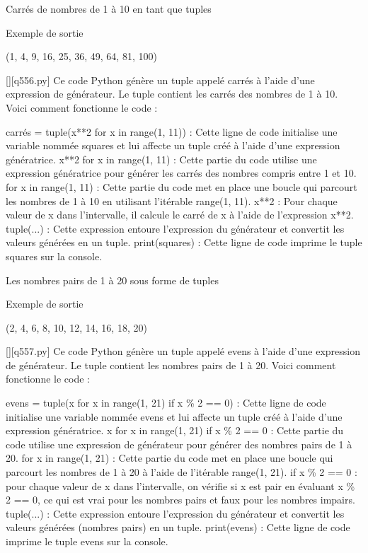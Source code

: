 \renewcommand{\chemincode}{../../code/}
    \question
Carrés de nombres de 1 à 10 en tant que tuples

Exemple de sortie

(1, 4, 9, 16, 25, 36, 49, 64, 81, 100)
        \par
        \begin{solution}
            \renewcommand{\nomfichier}{q556.py}
            \pythonfile{\chemincode \nomfichier}[][\nomfichier]
            Ce code Python génère un tuple appelé carrés à l'aide d'une expression de générateur. Le tuple contient les carrés des nombres de 1 à 10. Voici comment fonctionne le code :

    carrés = tuple(x**2 for x in range(1, 11)) : Cette ligne de code initialise une variable nommée squares et lui affecte un tuple créé à l'aide d'une expression génératrice.
        x**2 for x in range(1, 11) : Cette partie du code utilise une expression génératrice pour générer les carrés des nombres compris entre 1 et 10.
            for x in range(1, 11) : Cette partie du code met en place une boucle qui parcourt les nombres de 1 à 10 en utilisant l'itérable range(1, 11).
            x**2 : Pour chaque valeur de x dans l'intervalle, il calcule le carré de x à l'aide de l'expression x**2.
        tuple(...) : Cette expression entoure l'expression du générateur et convertit les valeurs générées en un tuple.
    print(squares) : Cette ligne de code imprime le tuple squares sur la console.
        \end{solution}
        

        \question
        Les nombres pairs de 1 à 20 sous forme de tuples

Exemple de sortie

(2, 4, 6, 8, 10, 12, 14, 16, 18, 20)
        \par
        \begin{solution}
            \renewcommand{\nomfichier}{q557.py}
            \pythonfile{\chemincode \nomfichier}[][\nomfichier]
            Ce code Python génère un tuple appelé evens à l'aide d'une expression de générateur. Le tuple contient les nombres pairs de 1 à 20. Voici comment fonctionne le code :

    evens = tuple(x for x in range(1, 21) if x \% 2 == 0) : Cette ligne de code initialise une variable nommée evens et lui affecte un tuple créé à l'aide d'une expression génératrice.
        x for x in range(1, 21) if x \% 2 == 0 : Cette partie du code utilise une expression de générateur pour générer des nombres pairs de 1 à 20.
            for x in range(1, 21) : Cette partie du code met en place une boucle qui parcourt les nombres de 1 à 20 à l'aide de l'itérable range(1, 21).
            if x \% 2 == 0 : pour chaque valeur de x dans l'intervalle, on vérifie si x est pair en évaluant x \% 2 == 0, ce qui est vrai pour les nombres pairs et faux pour les nombres impairs.
        tuple(...) : Cette expression entoure l'expression du générateur et convertit les valeurs générées (nombres pairs) en un tuple.
    print(evens) : Cette ligne de code imprime le tuple evens sur la console.
        \end{solution}
        

